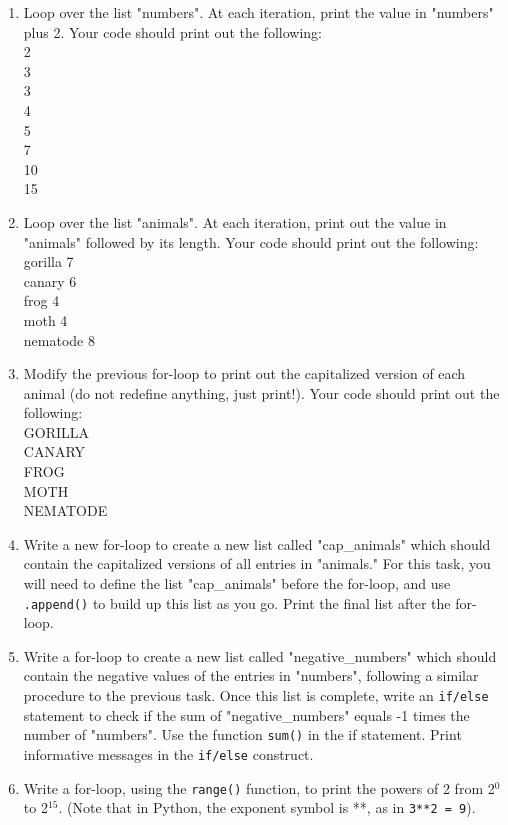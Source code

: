 \documentclass{article}[12pt]
\newcommand{\code}[1]{\texttt{#1}}  %
\begin{document}
\begin{enumerate}

    \item Loop over the list "numbers". At each iteration, print the value in "numbers" plus 2. Your code should print out the following:\\
        2 \\ 
        3 \\
        3 \\
        4 \\
        5 \\
        7 \\
        10 \\
        15 \\
    \item Loop over the list "animals". At each iteration, print out the value in "animals" followed by its length. Your code should print out the following:\\
        gorilla 7 \\
        canary 6  \\
        frog 4    \\
        moth 4     \\
        nematode 8  \\
    \item Modify the previous for-loop to print out the capitalized version of each animal (do not redefine anything, just print!). Your code should print out the following:\\
        GORILLA \\
        CANARY  \\
        FROG    \\
        MOTH     \\
        NEMATODE  \\
    \item Write a new for-loop to create a new list called "cap\_animals" which should contain the capitalized versions of all entries in "animals." For this task, you will need to define the list "cap\_animals" before the for-loop, and use \code{.append()} to build up this list as you go. Print the final list after the for-loop.
    \item Write a for-loop to create a new list called "negative\_numbers" which should contain the negative values of the entries in "numbers", following a similar procedure to the previous task. Once this list is complete, write an \code{if/else} statement to check if the sum of "negative\_numbers" equals -1 times the number of "numbers". Use the function \code{sum()} in the if statement. Print informative messages in the \code{if/else} construct.
	\item Write a for-loop, using the \code{range()} function, to print the powers of 2 from 2$^0$ to 2$^{15}$. (Note that in Python, the exponent symbol is **, as in \code{3**2 = 9}).
	

\end{enumerate}
\end{document}
